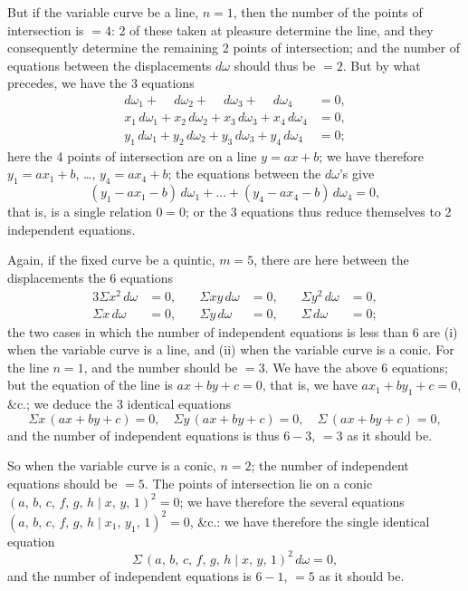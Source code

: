 \documentclass[11pt,a4paper]{article}
\theoremstyle{plain}
\theoremstyle{definition}
\theoremstyle{remark}
\begin{document}
But if the variable curve be a line, $n=1$, then the number of the points of intersection is $=4$: 2 of these taken at pleasure determine the line, and they consequently determine the remaining 2 points of intersection; and the number of equations between the displacements $d\omega$ should thus be $=2$. But by what precedes, we have the 3 equations
\begin{align*}
d\omega_1 + \phantom{x_1}\,d\omega_2 + \phantom{x_2}\,d\omega_3 + \phantom{x_3}\,d\omega_4 &= 0,\\
x_1\,d\omega_1 + x_2\,d\omega_2 + x_3\,d\omega_3 + x_4\,d\omega_4 &= 0,\\
y_1\,d\omega_1 + y_2\,d\omega_2 + y_3\,d\omega_3 + y_4\,d\omega_4 &= 0;
\end{align*}
here the 4 points of intersection are on a line $y = ax + b$; we have therefore $y_1 = ax_1 + b$, \ldots, $y_4 = ax_4 + b$; the equations between the $d\omega$'s give
\[
(y_1 - ax_1 - b)\,d\omega_1 + \ldots + (y_4 - ax_4 - b)\,d\omega_4 = 0,
\]
that is, is a single relation $0=0$; or the 3 equations thus reduce themselves to 2 independent equations.

Again, if the fixed curve be a quintic, $m=5$, there are here between the displacements the 6 equations
\begin{alignat*}{3}
\Sigma x^2\,d\omega &= 0,\quad & \Sigma xy\,d\omega &= 0,\quad & \Sigma y^2\,d\omega &= 0,\\
\Sigma x\,d\omega &= 0,\quad & \Sigma y\,d\omega &= 0,\quad & \Sigma\,d\omega &= 0;
\end{alignat*}
the two cases in which the number of independent equations is less than 6 are (i) when the variable curve is a line, and (ii) when the variable curve is a conic. For the line $n=1$, and the number should be $=3$. We have the above 6 equations; but the equation of the line is $ax + by + c = 0$, that is, we have $ax_1 + by_1 + c = 0$, \&c.; we deduce the 3 identical equations
\[
\Sigma x\,(ax+by+c) = 0,\quad \Sigma y\,(ax+by+c) = 0,\quad \Sigma\,(ax+by+c) = 0,
\]
and the number of independent equations is thus $6-3$, $=3$ as it should be.

So when the variable curve is a conic, $n=2$; the number of independent equations should be $=5$. The points of intersection lie on a conic $(a,\,b,\,c,\,f,\,g,\,h\!\mid\!x,\,y,\,1)^2 = 0$; we have therefore the several equations $(a,\,b,\,c,\,f,\,g,\,h\!\mid\!x_1,\,y_1,\,1)^2 = 0$, \&c.: we have therefore the single identical equation
\[
\Sigma\,(a,\,b,\,c,\,f,\,g,\,h\!\mid\!x,\,y,\,1)^2\,d\omega = 0,
\]
and the number of independent equations is $6-1$, $=5$ as it should be.
\end{document}
